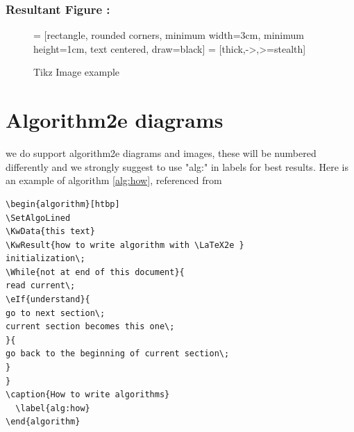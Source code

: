 \subsubsection{Resultant Figure :}
\begin{figure}

  \centering
{} = [rectangle, rounded corners,
minimum width=3cm, 
minimum height=1cm,
text centered, 
draw=black]
 = [thick,->,>=stealth]
\caption{Tikz Image example}
  \label{fig:tikz}
\end{figure}


\section{Algorithm2e diagrams}

we do support algorithm2e diagrams and images, these will be numbered differently
and we strongly suggest to use "alg:" in labels for best results. 
Here is an example of algorithm \ref{alg:how}, referenced from \cite{algoexample}

\begin{verbatim}
\begin{algorithm}[htbp]
\SetAlgoLined
\KwData{this text}
\KwResult{how to write algorithm with \LaTeX2e }
initialization\;
\While{not at end of this document}{
read current\;
\eIf{understand}{
go to next section\;
current section becomes this one\;
}{
go back to the beginning of current section\;
}
}
\caption{How to write algorithms}
  \label{alg:how}
\end{algorithm}
\end{verbatim}

